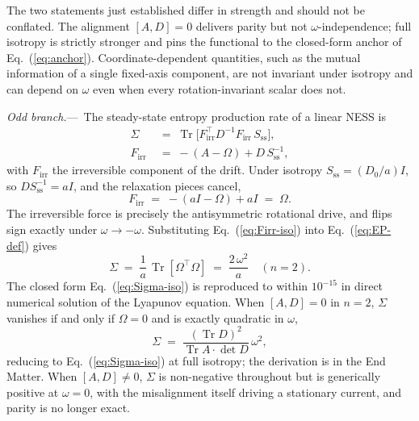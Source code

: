 \documentclass[%
 reprint,
 superscriptaddress,
 nofootinbib,
 nobibnotes,
 amsmath,amssymb,
 aps,
 prl,
 floatfix,
]{revtex4-2}
\newcommand{\Sss}{S_{\mathrm{ss}}}
\newcommand{\Firr}{F_{\mathrm{irr}}}
\newcommand{\Tr}{\operatorname{Tr}}
\newcommand{\plsubsection}[1]{\par\smallskip\noindent\textit{#1.}---\,\ignorespaces}
\begin{document}
The two statements just established differ in strength and should not be conflated. The alignment $[A,D]=0$ delivers parity but not $\omega$-independence; full isotropy is strictly stronger and pins the functional to the closed-form anchor of Eq.~(\ref{eq:anchor}). Coordinate-dependent quantities, such as the mutual information of a single fixed-axis component, are not invariant under isotropy and can depend on $\omega$ even when every rotation-invariant scalar does not.

\plsubsection{Odd branch}%
The steady-state entropy production rate of a linear NESS is~\cite{Tome2006,Godreche2019}
\begin{equation}\label{eq:EP-def}
\begin{aligned}
\Sigma &\;=\; \Tr\!\bigl[\Firr^\top D^{-1} \Firr\,\Sss\bigr], \\
\Firr &\;=\; -(A - \Omega) + D\,\Sss^{-1},
\end{aligned}
\end{equation}
with $\Firr$ the irreversible component of the drift. Under isotropy $\Sss = (D_0/a) I$, so $D \Sss^{-1} = a I$, and the relaxation pieces cancel,
\begin{equation}\label{eq:Firr-iso}
\Firr \;=\; -(a I - \Omega) + a I \;=\; \Omega.
\end{equation}
The irreversible force is precisely the antisymmetric rotational drive, and flips sign exactly under $\omega \to -\omega$. Substituting Eq.~(\ref{eq:Firr-iso}) into Eq.~(\ref{eq:EP-def}) gives
\begin{equation}\label{eq:Sigma-iso}
\Sigma \;=\; \frac{1}{a}\,\Tr[\Omega^\top \Omega] \;=\; \frac{2\,\omega^2}{a} \quad (n = 2).
\end{equation}
The closed form Eq.~(\ref{eq:Sigma-iso}) is reproduced to within $10^{-15}$ in direct numerical solution of the Lyapunov equation. When $[A,D] = 0$ in $n=2$, $\Sigma$ vanishes if and only if $\Omega = 0$ and is exactly quadratic in $\omega$,
\begin{equation}\label{eq:Sigma-aligned}
\Sigma \;=\; \frac{(\Tr D)^2}{\Tr A \cdot \det D}\,\omega^2,
\end{equation}
reducing to Eq.~(\ref{eq:Sigma-iso}) at full isotropy; the derivation is in the End Matter. When $[A,D] \neq 0$, $\Sigma$ is non-negative throughout but is generically positive at $\omega = 0$, with the misalignment itself driving a stationary current, and parity is no longer exact.
\end{document}
